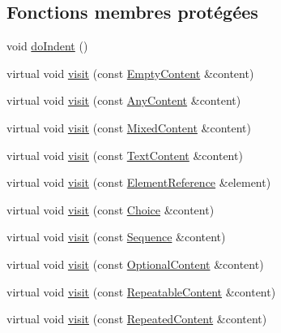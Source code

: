 \subsection*{Fonctions membres protégées}
\begin{DoxyCompactItemize}
\item 
void \hyperlink{classdtd_1_1_output_d_t_d_visitor_a5b8ee3a36a298245971b54b5307dd14f}{doIndent} ()
\item 
virtual void \hyperlink{classdtd_1_1_output_d_t_d_visitor_a3eb81ed67c53e9aebb90a4558f13a402}{visit} (const \hyperlink{classdtd_1_1_empty_content}{EmptyContent} \&content)
\item 
virtual void \hyperlink{classdtd_1_1_output_d_t_d_visitor_a17406ea51970e67da79947709945c4b1}{visit} (const \hyperlink{classdtd_1_1_any_content}{AnyContent} \&content)
\item 
virtual void \hyperlink{classdtd_1_1_output_d_t_d_visitor_a47692e383524d7804a6f5bf4d3f229b8}{visit} (const \hyperlink{classdtd_1_1_mixed_content}{MixedContent} \&content)
\item 
virtual void \hyperlink{classdtd_1_1_output_d_t_d_visitor_ad06e4a71ec8f36d91d59eb24ddc51f70}{visit} (const \hyperlink{classdtd_1_1_text_content}{TextContent} \&content)
\item 
virtual void \hyperlink{classdtd_1_1_output_d_t_d_visitor_a4b286b6b0ca83035e25cef1ba6f10c47}{visit} (const \hyperlink{classdtd_1_1_element_reference}{ElementReference} \&element)
\item 
virtual void \hyperlink{classdtd_1_1_output_d_t_d_visitor_a666c828c10840930fd420e86030e16f1}{visit} (const \hyperlink{classdtd_1_1_choice}{Choice} \&content)
\item 
virtual void \hyperlink{classdtd_1_1_output_d_t_d_visitor_a5b9434224d99c416da826a88cd11df3f}{visit} (const \hyperlink{classdtd_1_1_sequence}{Sequence} \&content)
\item 
virtual void \hyperlink{classdtd_1_1_output_d_t_d_visitor_a5ea91964e78eef4fc0786708154204bc}{visit} (const \hyperlink{classdtd_1_1_optional_content}{OptionalContent} \&content)
\item 
virtual void \hyperlink{classdtd_1_1_output_d_t_d_visitor_a93c6d6c010e58356bf9ba29b56d561df}{visit} (const \hyperlink{classdtd_1_1_repeatable_content}{RepeatableContent} \&content)
\item 
virtual void \hyperlink{classdtd_1_1_output_d_t_d_visitor_a01a2c44557480982c2ca5d3769e72c00}{visit} (const \hyperlink{classdtd_1_1_repeated_content}{RepeatedContent} \&content)
\end{DoxyCompactItemize}

